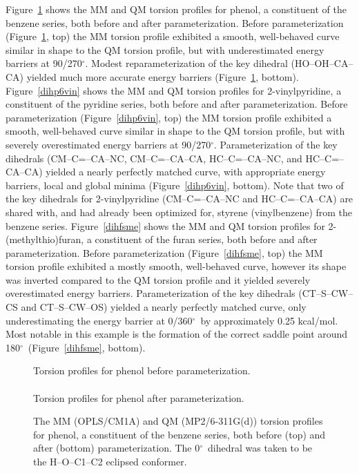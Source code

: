 \documentclass[12pt]{report}
\def\deg{$^{\circ}$}
\def\figlab{Figure}\def\figslab{\figlab s}
\newcommand*\fig[1]{\figlab~\ref{#1}}
\begin{document}
\fig{dihphoh} shows the MM and QM torsion profiles for phenol, a constituent of the benzene series, both before and after parameterization. Before parameterization (\fig{dihphoh}, top) the MM torsion profile exhibited a smooth, well-behaved curve similar in shape to the QM torsion profile, but with underestimated energy barriers at 90/270\deg. Modest reparameterization of the key dihedral (HO--OH--CA--CA) yielded much more accurate energy barriers (\fig{dihphoh}, bottom). \fig{dihp6vin} shows the MM and QM torsion profiles for 2-vinylpyridine, a constituent of the pyridine series, both before and after parameterization. Before parameterization (\fig{dihp6vin}, top) the MM torsion profile exhibited a smooth, well-behaved curve similar in shape to the QM torsion profile, but with severely overestimated energy barriers at 90/270\deg. Parameterization of the key dihedrals (CM--C=--CA--NC, CM--C=--CA--CA, HC--C=--CA--NC, and HC--C=--CA--CA) yielded a nearly perfectly matched curve, with appropriate energy barriers, local and global minima (\fig{dihp6vin}, bottom). Note that two of the key dihedrals for 2-vinylpyridine (CM--C=--CA--NC and HC--C=--CA--CA) are shared with, and had already been optimized for, styrene (vinylbenzene) from the benzene series. \fig{dihfsme} shows the MM and QM torsion profiles for 2-(methylthio)furan, a constituent of the furan series, both before and after parameterization. Before parameterization (\fig{dihfsme}, top) the MM torsion profile exhibited a mostly smooth, well-behaved curve, however its shape was inverted compared to the QM torsion profile and it yielded severely overestimated energy barriers. Parameterization of the key dihedrals (CT--S--CW--CS and CT--S--CW--OS) yielded a nearly perfectly matched curve, only underestimating the energy barrier at 0/360\deg\ by approximately 0.25 kcal/mol. Most notable in this example is the formation of the correct saddle point around 180\deg\ (\fig{dihfsme}, bottom).

\begin{figure}[htbp]
\centering
Torsion profiles for phenol before parameterization.\\
\\
Torsion profiles for phenol after parameterization.\\

\caption{The MM (OPLS/CM1A) and QM (MP2/6-311G(d)) torsion profiles for phenol, a constituent of the benzene series, both before (top) and after (bottom) parameterization. The 0\deg\ dihedral was taken to be the H--O--C1--C2 eclipsed conformer.}
\label{dihphoh}
\end{figure}
\end{document}
